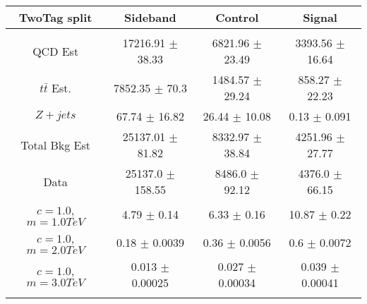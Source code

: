 \begin{footnotesize} 
\begin{tabular}{c|c|c|c} 
TwoTag split & Sideband & Control & Signal \\ 
\hline\hline 
& & & \\ 
QCD Est & 17216.91 $\pm$ 38.33 & 6821.96 $\pm$ 23.49 & 3393.56 $\pm$ 16.64\\ 
$t\bar{t}$ Est.  & 7852.35 $\pm$ 70.3 & 1484.57 $\pm$ 29.24 & 858.27 $\pm$ 22.23\\ 
$Z+jets$ & 67.74 $\pm$ 16.82 & 26.44 $\pm$ 10.08 & 0.13 $\pm$ 0.091\\ 
Total Bkg Est & 25137.01 $\pm$ 81.82 & 8332.97 $\pm$ 38.84 & 4251.96 $\pm$ 27.77\\ 
Data & 25137.0 $\pm$ 158.55 & 8486.0 $\pm$ 92.12 & 4376.0 $\pm$ 66.15\\ 
$c=1.0$,$m=1.0TeV$ & 4.79 $\pm$ 0.14 & 6.33 $\pm$ 0.16 & 10.87 $\pm$ 0.22\\ 
$c=1.0$,$m=2.0TeV$ & 0.18 $\pm$ 0.0039 & 0.36 $\pm$ 0.0056 & 0.6 $\pm$ 0.0072\\ 
$c=1.0$,$m=3.0TeV$ & 0.013 $\pm$ 0.00025 & 0.027 $\pm$ 0.00034 & 0.039 $\pm$ 0.00041\\ 
& & & \\ 
\hline\hline 
\end{tabular} 
\end{footnotesize} 
\newline 
